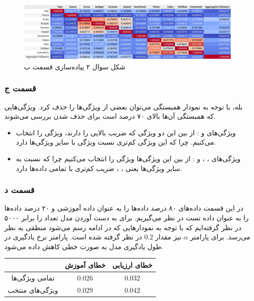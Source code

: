 \documentclass[14pt,a4]{article}
\begin{document}
\begin{figure}[h]
    \centering
    \includegraphics[width=\linewidth]{images/implementation/q2/part_b.png}
    \caption{شکل سوال ۲ پیاده‌سازی قسمت ب}
    \label{implementation-q2p2}
\end{figure}


\subsubsection*{قسمت ج}

بله، با توجه به نمودار همبستگی می‌توان بعضی از ویژگی‌ها را حذف کرد. ویژگی‌هایی که همبستگی‌ آن‌ها بالای
۷۰ درصد است برای حذف شدن بررسی می‌شوند.

\begin{itemize}
    \item ویژگی‌های  و : از بین این دو ویژگی که ضریب  بالایی را دارند،
    ویژگی  را انتخاب می‌کنیم. چرا که این ویژگی  کم‌تری نسبت ویژگی  با
    سایر ویژگی‌ها دارد.
    \item ویژگی‌های ، ،  و : از بین این ویژگی‌ها ویژگی 
    را انتخاب می‌کنیم چرا که نسبت به سایر ویژگی‌ها یعنی ، ،  ضریب 
    کم‌تری با تمامی داده‌ها دارد.
\end{itemize}

\subsubsection*{قسمت د}

در این قسمت داده‌های ۸۰ درصد داده‌ها را به عنوان داده آموزشی و ۲۰ درصد داده‌ها را به عنوان داده تست در نظر می‌گیریم.
برای به دست آوردن مدل تعداد  را برابر ۵۰۰۰ در نظر گرفته‌ایم که با توجه به نمودار‌هایی که در ادامه
رسم می‌شود منطقی به نظر می‌رسد. برای پارامتر $\alpha$ نیز مقدار $0.2$ در نظر گرفته شده است. پارامتر نرخ یادگیری
در طول یادگیری مدل به صورت خطی کاهش داده می‌شود.

\begin{table}
    \centering
    \begin{tabular}{c|c|c}
         & خطای آموزش & خطای ارزیابی  \\
        \hline
        تمامی ویژگی‌ها & $0.026$ & $0.032$ \\
        ویژگی‌های منتخب & $0.029$ & $0.042$
    \end{tabular}
\end{table}
\end{document}
